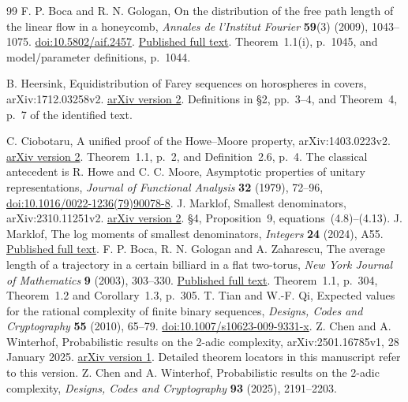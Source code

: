 \documentclass[11pt,a4paper]{article}
\numberwithin{equation}{section}
\theoremstyle{remark}
\begin{document}
\begin{thebibliography}{99}
F. P. Boca and R. N. Gologan,
On the distribution of the free path length of the linear flow in a honeycomb,
\emph{Annales de l'Institut Fourier} \textbf{59}(3) (2009), 1043--1075.
\href{https://doi.org/10.5802/aif.2457}{doi:10.5802/aif.2457}.
\href{https://www.numdam.org/item/10.5802/aif.2457.pdf}{Published full text}.
Theorem~1.1(i), p.~1045, and model/parameter definitions, p.~1044.
\begingroup\raggedright
B. Heersink,
Equidistribution of Farey sequences on horospheres in covers,
arXiv:1712.03258v2.
\href{https://arxiv.org/abs/1712.03258v2}{arXiv version 2}.
Definitions in \S2, pp.~3--4, and Theorem~4, p.~7 of the identified text.
\par\endgroup
{}
C. Ciobotaru,
A unified proof of the Howe--Moore property,
arXiv:1403.0223v2.
\href{https://arxiv.org/abs/1403.0223v2}{arXiv version 2}.
Theorem~1.1, p.~2, and Definition~2.6, p.~4.
The classical antecedent is R. Howe and C. C. Moore,
Asymptotic properties of unitary representations,
\emph{Journal of Functional Analysis} \textbf{32} (1979), 72--96,
\href{https://doi.org/10.1016/0022-1236(79)90078-8}{doi:10.1016/0022-1236(79)90078-8}.
J. Marklof,
Smallest denominators, arXiv:2310.11251v2.
\href{https://arxiv.org/abs/2310.11251v2}{arXiv version 2}.
\S4, Proposition~9, equations~(4.8)--(4.13).
J. Marklof,
The log moments of smallest denominators,
\emph{Integers} \textbf{24} (2024), A55.
\href{https://math.colgate.edu/~integers/y55/y55.pdf}{Published full text}.
F. P. Boca, R. N. Gologan and A. Zaharescu,
The average length of a trajectory in a certain billiard in a flat two-torus,
\emph{New York Journal of Mathematics} \textbf{9} (2003), 303--330.
\href{https://nyjm.albany.edu/j/2003/9-16p.pdf}{Published full text}.
Theorem~1.1, p.~304, Theorem~1.2 and Corollary~1.3, p.~305.
T. Tian and W.-F. Qi,
Expected values for the rational complexity of finite binary sequences,
\emph{Designs, Codes and Cryptography} \textbf{55} (2010), 65--79.
\href{https://doi.org/10.1007/s10623-009-9331-x}{doi:10.1007/s10623-009-9331-x}.
Z. Chen and A. Winterhof,
Probabilistic results on the 2-adic complexity,
arXiv:2501.16785v1, 28 January 2025.
\href{https://arxiv.org/abs/2501.16785v1}{arXiv version 1}.
Detailed theorem locators in this manuscript refer to this version.
Z. Chen and A. Winterhof,
Probabilistic results on the 2-adic complexity,
\emph{Designs, Codes and Cryptography} \textbf{93} (2025), 2191--2203.

\end{thebibliography}
\end{document}
